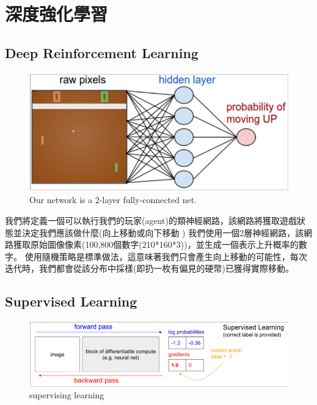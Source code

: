 \documentclass[14pt,a4paper]{report}  %
\begin{document}
\section{深度強化學習}
\subsection{Deep Reinforcement Learning}
\begin{figure}[hbt!]
\begin{center}
\includegraphics[scale=0.74]{ network}
\caption{Our network is a 2-layer fully-connected net. }%
\end{center}
\end{figure}

\qquad 我們將定義一個可以執行我們的玩家(agent)的類神經網路，該網路將獲取遊戲狀態並決定我們應該做什麼(向上移動或向下移動
) 我們使用一個2層神經網路，該網路獲取原始圖像像素(100,800個數字(210*160*3))，並生成一個表示上升概率的數字。 使用隨機策略是標準做法，這意味著我們只會產生向上移動的可能性，每次迭代時，我們都會從該分布中採樣(即扔一枚有偏見的硬幣)已獲得實際移動。\\


\subsection{Supervised Learning}
\begin{figure}[hbt!]
\begin{center}
\includegraphics[scale=0.74]{supervising_learning}
\caption{supervising learning }%
\end{center}
\end{figure}
\end{document}
